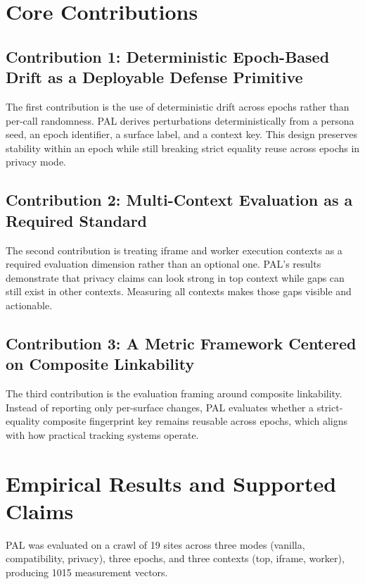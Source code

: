 \documentclass[11pt]{report}
\begin{document}
\section{Core Contributions}

\subsection{Contribution 1: Deterministic Epoch-Based Drift as a Deployable Defense Primitive}

The first contribution is the use of deterministic drift across epochs rather than per-call randomness. PAL derives perturbations deterministically from a persona seed, an epoch identifier, a surface label, and a context key. This design preserves stability within an epoch while still breaking strict equality reuse across epochs in privacy mode.

\subsection{Contribution 2: Multi-Context Evaluation as a Required Standard}

The second contribution is treating iframe and worker execution contexts as a required evaluation dimension rather than an optional one. PAL’s results demonstrate that privacy claims can look strong in top context while gaps can still exist in other contexts. Measuring all contexts makes those gaps visible and actionable.

\subsection{Contribution 3: A Metric Framework Centered on Composite Linkability}

The third contribution is the evaluation framing around composite linkability. Instead of reporting only per-surface changes, PAL evaluates whether a strict-equality composite fingerprint key remains reusable across epochs, which aligns with how practical tracking systems operate.

\section{Empirical Results and Supported Claims}

PAL was evaluated on a crawl of 19 sites across three modes (vanilla, compatibility, privacy), three epochs, and three contexts (top, iframe, worker), producing 1015 measurement vectors.
\end{document}

